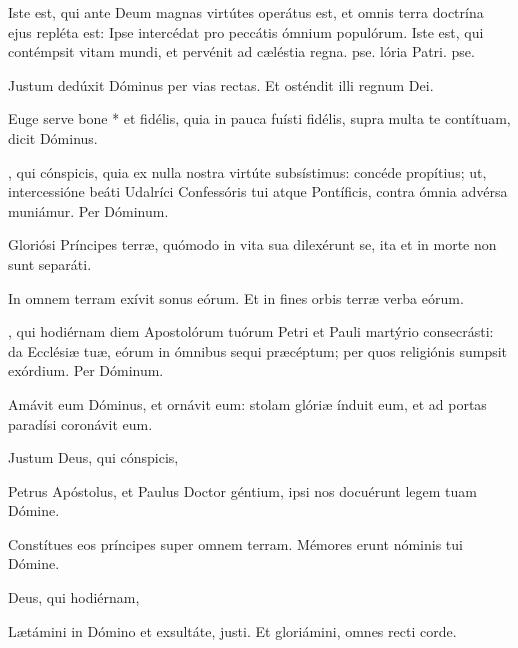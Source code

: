 \documentclass[fontsize=9pt,paper=A6,twoside,BCOR=1mm,DIV=22,headinclude]{scrarticle}
\renewcommand\A{\Ant}
\begin{document}
\begin{multicols}{2}
\R Iste est, qui ante Deum magnas virtútes operátus est, et omnis terra doctrína ejus repléta est: \red{*} Ipse intercédat pro peccátis ómnium populórum.
\V Iste est, qui contémpsit vitam mundi, et pervénit ad cæléstia regna. pse. lória Patri. pse.


\V Justum dedúxit Dóminus per vias rectas.
\R Et osténdit illi regnum Dei.

 Euge serve bone * et fidélis, quia in pauca fuísti fidélis, supra multa te contítuam, dicit Dóminus.

, qui cónspicis, quia ex nulla nostra virtúte subsístimus: concéde propítius; ut, intercessióne beáti Udalríci Confessóris tui atque Pontíficis, contra ómnia advérsa muniámur. Per Dóminum.


\A Gloriósi Príncipes terræ, quómodo in vita sua dilexérunt se, ita et in morte non sunt separáti.

\V In omnem terram exívit sonus eórum.
\R Et in fines orbis terræ verba eórum.

, qui hodiérnam diem Apostolórum tuórum Petri et Pauli martýrio consecrásti: da Ecclésiæ tuæ, eórum in ómnibus sequi præcéptum; per quos religiónis sumpsit exórdium. Per Dóminum.


\A Amávit eum Dóminus, et ornávit eum: stolam glóriæ índuit eum, et ad portas paradísi coronávit eum.

\V Justum  Deus, qui cónspicis, 


\A Petrus Apóstolus, et Paulus Doctor géntium, ipsi nos docuérunt legem tuam Dómine.

\V Constítues eos príncipes super omnem terram.
\R Mémores erunt nóminis tui Dómine.

 Deus, qui hodiérnam, 


{
\V Lætámini in Dómino et exsultáte, justi.
\R Et gloriámini, omnes recti corde.

}
\end{multicols}
\end{document}
